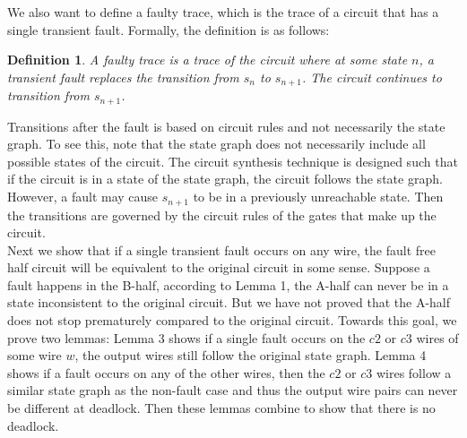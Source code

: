 \documentclass[12pt]{report}
\newtheorem*{definition}{Definition}
\begin{document}
We also want to define a faulty trace, which is the trace of a circuit that has a single transient fault.  Formally, the definition is as follows:
\begin{definition}
A {\em faulty trace} is a trace of the circuit where at some state $n$, a transient fault replaces the transition from $s_n$ to $s_{n+1}$.  The circuit continues to transition from $s_{n+1}$.   
\end{definition}
Transitions after the fault is based on circuit rules and not necessarily the state graph.  To see this, note that the state graph does not necessarily include all possible states of the circuit.  The circuit synthesis technique is designed such that if the circuit is in a state of the state graph, the circuit follows the state graph.  However, a fault may cause $s_{n+1}$ to be in a previously unreachable state.  Then the transitions are governed by the circuit rules of the gates that make up the circuit.\\ %

Next we show that if a single transient fault occurs on any wire, the fault free half circuit will be equivalent to the original circuit in some sense.  
Suppose a fault happens in the B-half, according to Lemma 1, the A-half can never be in a state inconsistent to the original circuit.  But we have not proved that the A-half does not stop prematurely compared to the original circuit.  Towards this goal, we prove two lemmas:  Lemma 3 shows if a single fault occurs on the $c2$ or $c3$ wires of some wire $w$, the output wires still follow the original state graph.  Lemma 4 shows if a fault occurs on any of the other wires, then the $c2$ or $c3$ wires follow a similar state graph as the non-fault case and thus the output wire pairs can never be different at deadlock.  Then these lemmas combine to show that there is no deadlock.

\end{document}
